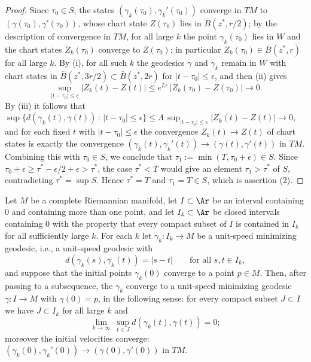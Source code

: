 \begin{proof}
Since $\tau_0\in S$, the states $(\gamma_k(\tau_0),\gamma_k'(\tau_0))$
converge in $TM$ to $(\gamma(\tau_0),\gamma'(\tau_0))$, whose chart
state $Z(\tau_0)$ lies in $\overline{B}(z^*,r/2)$; by the description
of convergence in $TM$, for all large $k$ the point
$\gamma_k(\tau_0)$ lies in $W$ and the chart states $Z_k(\tau_0)$
converge to $Z(\tau_0)$; in particular
$Z_k(\tau_0)\in\overline{B}(z^*,r)$ for all large $k$. By (i), for
all such $k$ the geodesics $\gamma$ and $\gamma_k$ remain in $W$ with
chart states in $\overline{B}(z^*,3r/2)\subset\overline{B}(z^*,2r)$
for $|t-\tau_0|\le\epsilon$, and then (ii) gives
$$\sup_{|t-\tau_0|\le\epsilon}|Z_k(t)-Z(t)|
\le e^{L\epsilon}\,|Z_k(\tau_0)-Z(\tau_0)|\longrightarrow0.$$
By (iii) it follows that
$\sup\{d(\gamma_k(t),\gamma(t))\,:\,|t-\tau_0|\le\epsilon\}
\le\Lambda\,\sup_{|t-\tau_0|\le\epsilon}|Z_k(t)-Z(t)|
\rightarrow0$, and for each fixed $t$ with $|t-\tau_0|\le\epsilon$
the convergence $Z_k(t)\rightarrow Z(t)$ of chart states is exactly
the convergence $(\gamma_k(t),\gamma_k'(t))\rightarrow
(\gamma(t),\gamma'(t))$ in $TM$. Combining this with $\tau_0\in S$,
we conclude that $\tau_1:=\min(T,\tau_0+\epsilon)\in S$. Since
$\tau_0+\epsilon\ge\tau^*-\epsilon/2+\epsilon>\tau^*$, the case
$\tau^*<T$ would give an element $\tau_1>\tau^*$ of $S$,
contradicting $\tau^*=\sup S$. Hence $\tau^*=T$ and $\tau_1=T\in S$,
which is assertion (2).
\end{proof}

\begin{lemma}
\label{lem:limit-of-minimizing-geodesics}
\leanok
{}
Let $M$ be a complete Riemannian manifold, let $I\subset\Ar$ be an
interval containing $0$ and containing more than one point, and let
$I_k\subset\Ar$ be closed intervals containing $0$ with the property
that every compact subset of $I$ is contained in $I_k$ for all
sufficiently large $k$. For each $k$ let $\gamma_k\colon I_k\to M$ be
a unit-speed minimizing geodesic, i.e., a unit-speed geodesic with
$$d(\gamma_k(s),\gamma_k(t))=|s-t|\qquad\text{for all } s,t\in I_k,$$
and suppose that the initial points $\gamma_k(0)$ converge to a point
$p\in M$. Then, after passing to a subsequence, the $\gamma_k$
converge to a unit-speed minimizing geodesic $\gamma\colon I\to M$
with $\gamma(0)=p$, in the following sense: for every compact subset
$J\subset I$ we have $J\subset I_k$ for all large $k$ and
$$\lim_{k\rightarrow\infty}\ \sup_{t\in J}
d(\gamma_k(t),\gamma(t))=0;$$
moreover the initial velocities converge:
$(\gamma_k(0),\gamma_k'(0))\rightarrow(\gamma(0),\gamma'(0))$ in
$TM$.
\end{lemma}

